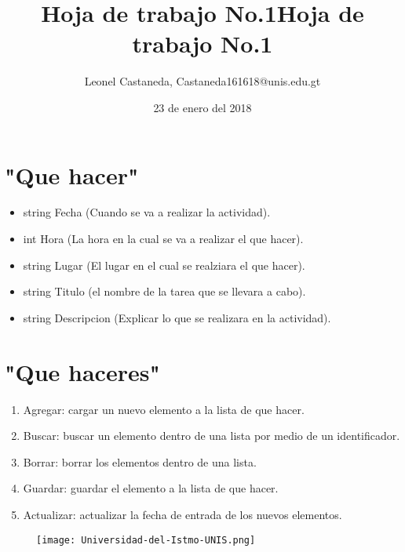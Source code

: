 \documentclass[10pt,a4paper]{article}
\author{Leonel Castaneda, Castaneda161618@unis.edu.gt}
\title{Hoja de trabajo No.1}
\date{23 de enero del 2018}
\begin{document}
\title{Hoja de trabajo No.1}
\maketitle{}


\section{"Que hacer"}
\begin{itemize}

\item string Fecha (Cuando se va a realizar la actividad).
\item int Hora (La hora en la cual se va a realizar el que hacer).
\item string Lugar (El lugar en el cual se realziara el que hacer).
\item string Titulo (el nombre de la tarea que se llevara a cabo).
\item string Descripcion (Explicar lo que se realizara en la actividad).

\end{itemize}

\section{"Que haceres"}
\begin{enumerate}
\item Agregar: cargar un nuevo elemento a la lista de que hacer.
\item Buscar: buscar un elemento dentro de una lista por medio de un identificador.
\item Borrar: borrar los elementos dentro de una lista.
\item Guardar: guardar el elemento a la lista de que hacer.
\item Actualizar: actualizar la fecha de entrada de los nuevos elementos.
\end{enumerate}

\begin{figure}[t!]

\texttt{[image: Universidad-del-Istmo-UNIS.png]}
\end{figure}
\end{document}
